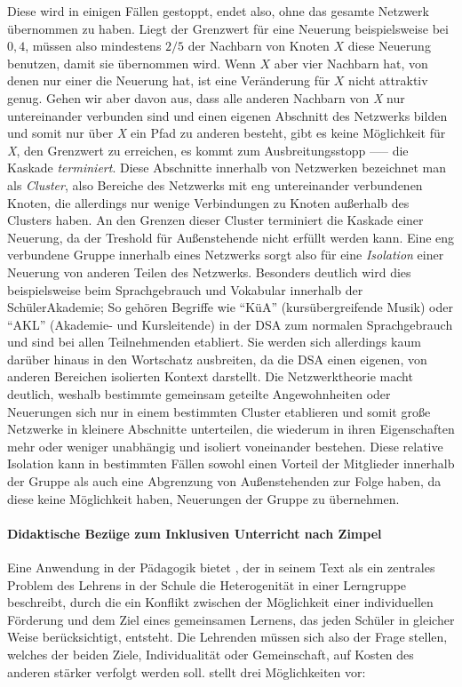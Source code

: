 Diese wird in einigen Fällen gestoppt, endet also, ohne das gesamte Netzwerk übernommen zu haben.
Liegt der Grenzwert für eine Neuerung beispielsweise bei $0,4$, müssen also mindestens $2/5$ der Nachbarn von Knoten $X$ diese Neuerung benutzen, damit sie übernommen wird.
Wenn $X$ aber vier Nachbarn hat, von denen nur einer die Neuerung hat, ist eine Veränderung für $X$ nicht attraktiv genug.
Gehen wir aber davon aus, dass alle anderen Nachbarn von \emph{X} nur untereinander verbunden sind und einen eigenen Abschnitt des Netzwerks bilden und somit nur über \emph{X} ein Pfad zu anderen besteht, gibt es keine Möglichkeit für \emph{X}, den Grenzwert zu erreichen, es kommt zum Ausbreitungsstopp ––– die Kaskade \emph{terminiert}.
Diese Abschnitte innerhalb von Netzwerken bezeichnet man als \emph{Cluster}, also Bereiche des Netzwerks mit eng untereinander verbundenen Knoten, die allerdings nur wenige Verbindungen zu Knoten außerhalb des Clusters haben.
An den Grenzen dieser Cluster terminiert die Kaskade einer Neuerung, da der Treshold für Außenstehende nicht erfüllt werden kann.
Eine eng verbundene Gruppe innerhalb eines Netzwerks sorgt also für eine \emph{Isolation} einer Neuerung von anderen Teilen des Netzwerks.
Besonders deutlich wird dies beispielsweise beim Sprachgebrauch und Vokabular innerhalb der SchülerAkademie;
So gehören Begriffe wie ``KüA'' (kursübergreifende Musik) oder ``AKL'' (Akademie- und Kursleitende) in der DSA zum normalen Sprachgebrauch und sind bei allen Teilnehmenden etabliert.
Sie werden sich allerdings kaum darüber hinaus in den Wortschatz ausbreiten, da die DSA einen eigenen, von anderen Bereichen isolierten Kontext darstellt.
Die Netzwerktheorie macht deutlich, weshalb bestimmte gemeinsam geteilte Angewohnheiten oder Neuerungen sich nur in einem bestimmten Cluster etablieren und somit große Netzwerke in kleinere Abschnitte unterteilen, die wiederum in ihren Eigenschaften mehr oder weniger unabhängig und isoliert voneinander bestehen.
Diese relative Isolation kann in bestimmten Fällen sowohl einen Vorteil der Mitglieder innerhalb der Gruppe als auch eine Abgrenzung von Außenstehenden zur Folge haben, da diese keine Möglichkeit haben, Neuerungen der Gruppe zu übernehmen.


\paragraph{Didaktische Bezüge zum Inklusiven Unterricht nach Zimpel}

Eine Anwendung in der Pädagogik bietet \textcite{Zimpel2012}, der in seinem Text als ein zentrales Problem des Lehrens in der Schule die Heterogenität in einer Lerngruppe beschreibt, durch die ein Konflikt zwischen der Möglichkeit einer individuellen Förderung und dem Ziel eines gemeinsamen Lernens, das jeden Schüler in gleicher Weise berücksichtigt, entsteht.
Die Lehrenden müssen sich also der Frage stellen, welches der beiden Ziele, Individualität oder Gemeinschaft, auf Kosten des anderen stärker verfolgt werden soll.
\citeauthor{Zimpel2012} stellt drei Möglichkeiten vor:

